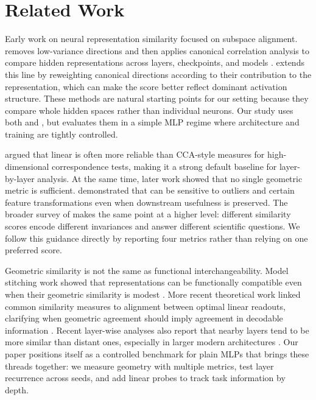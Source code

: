 \section{Related Work}
\label{sec:related_work}

 Early work on neural representation similarity focused on subspace alignment. \svcca removes low-variance directions and then applies canonical correlation analysis to compare hidden representations across layers, checkpoints, and models \cite{raghu2017svcca}. \pwcca extends this line by reweighting canonical directions according to their contribution to the representation, which can make the score better reflect dominant activation structure. These methods are natural starting points for our setting because they compare whole hidden spaces rather than individual neurons. Our study uses both \svcca and \pwcca, but evaluates them in a simple MLP regime where architecture and training are tightly controlled.

 \citet{kornblith2019similarity} argued that linear \cka is often more reliable than CCA-style measures for high-dimensional correspondence tests, making it a strong default baseline for layer-by-layer analysis. At the same time, later work showed that no single geometric metric is sufficient. \citet{davari2023reliability} demonstrated that \cka can be sensitive to outliers and certain feature transformations even when downstream usefulness is preserved. The broader survey of \citet{klabunde2023survey} makes the same point at a higher level: different similarity scores encode different invariances and answer different scientific questions. We follow this guidance directly by reporting four metrics rather than relying on one preferred score.

 Geometric similarity is not the same as functional interchangeability. Model stitching work showed that representations can be functionally compatible even when their geometric similarity is modest \cite{csiszarik2021similarity}. More recent theoretical work linked common similarity measures to alignment between optimal linear readouts, clarifying when geometric agreement should imply agreement in decodable information \cite{harvey2024decodable}. Recent layer-wise analyses also report that nearby layers tend to be more similar than distant ones, especially in larger modern architectures \cite{jiang2024tracing}. Our paper positions itself as a controlled benchmark for plain MLPs that brings these threads together: we measure geometry with multiple metrics, test layer recurrence across seeds, and add linear probes to track task information by depth.
